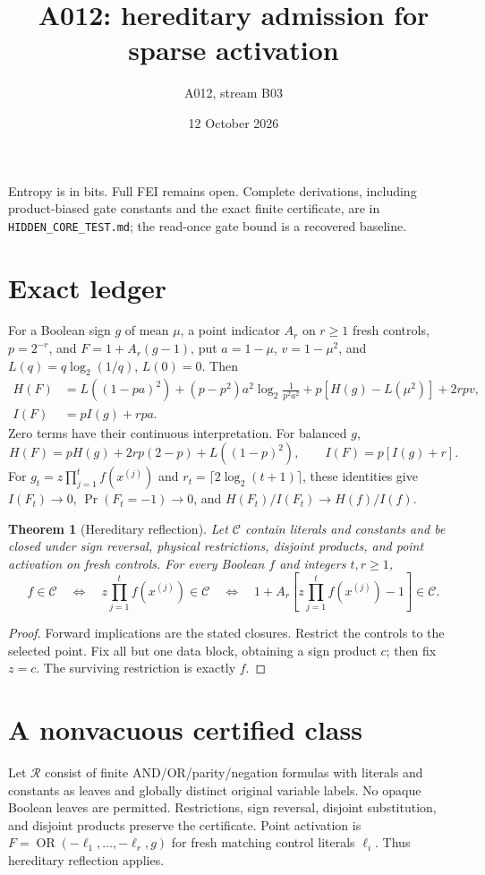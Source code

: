 \documentclass[11pt]{article}
\newtheorem{theorem}{Theorem}
\newcommand{\cR}{\mathcal R}
\begin{document}
\title{A012: hereditary admission for sparse activation}
\author{A012, stream B03}\date{12 October 2026}\maketitle
Entropy is in bits. Full FEI remains open. Complete derivations, including
product-biased gate constants and the exact finite certificate, are in
\texttt{HIDDEN\_CORE\_TEST.md}; the read-once gate bound is a recovered baseline.

\section*{Exact ledger}
For a Boolean sign $g$ of mean $\mu$, a point indicator $A_r$ on $r\ge1$
fresh controls, $p=2^{-r}$, and $F=1+A_r(g-1)$, put
$a=1-\mu$, $v=1-\mu^2$, and $L(q)=q\log_2(1/q)$, $L(0)=0$. Then
\begin{align*}
H(F)&=L((1-pa)^2)+(p-p^2)a^2\log_2\frac1{p^2a^2}
       +p[H(g)-L(\mu^2)]+2rpv,\\
I(F)&=pI(g)+rpa.
\end{align*}
Zero terms have their continuous interpretation. For balanced $g$,
\[
H(F)=pH(g)+2rp(2-p)+L((1-p)^2),\qquad I(F)=p[I(g)+r].
\]
For $g_t=z\prod_{j=1}^t f(x^{(j)})$ and
$r_t=\lceil2\log_2(t+1)\rceil$, these identities give
$I(F_t)\to0$, $\Pr(F_t=-1)\to0$, and
$H(F_t)/I(F_t)\to H(f)/I(f)$.

\begin{theorem}[Hereditary reflection]
Let $\mathcal C$ contain literals and constants and be closed under sign
reversal, physical restrictions, disjoint products, and point activation
on fresh controls. For every Boolean $f$ and integers $t,r\ge1$,
\[
f\in\mathcal C\quad\Longleftrightarrow\quad
z\prod_{j=1}^t f(x^{(j)})\in\mathcal C\quad\Longleftrightarrow\quad
1+A_r\left[z\prod_{j=1}^t f(x^{(j)})-1\right]\in\mathcal C.
\]
\end{theorem}
\begin{proof}
Forward implications are the stated closures. Restrict the controls to the
selected point. Fix all but one data block, obtaining a sign product $c$;
then fix $z=c$. The surviving restriction is exactly $f$.
\end{proof}

\section*{A nonvacuous certified class}
Let $\cR$ consist of finite AND/OR/parity/negation formulas with literals
and constants as leaves and globally distinct original variable labels.
No opaque Boolean leaves are permitted. Restrictions, sign reversal,
disjoint substitution, and disjoint products preserve the certificate.
Point activation is $F=\operatorname{OR}(-\ell_1,\ldots,-\ell_r,g)$ for
fresh matching control literals $\ell_i$. Thus hereditary reflection applies.
\end{document}

